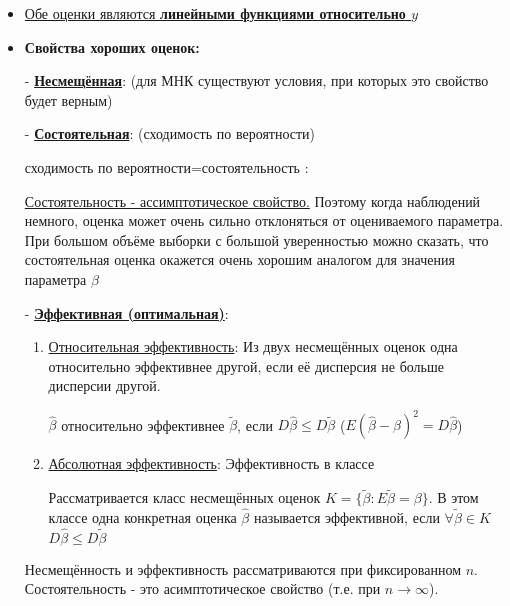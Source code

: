 \documentclass{article}
\begin{document}
\begin{itemize}
\item \underline{Обе оценки являются \textbf{линейными функциями относительно $y$}}

\vspace{2ex}

\item \textbf{Свойства хороших оценок:}
\item[-]\underline{\textbf{Несмещённая}}:  (для МНК существуют условия, при которых это свойство будет верным)
\item[-]\underline{\textbf{Состоятельная}}:  (сходимость по вероятности)

сходимость по вероятности=состоятельность : 

\underline{Состоятельность - ассимптотическое свойство.} Поэтому когда наблюдений немного, оценка может очень сильно отклоняться от оцениваемого параметра. При большом объёме выборки с большой уверенностью можно сказать, что состоятельная оценка окажется очень хорошим аналогом для значения параметра $\beta$

\item[-]\underline{\textbf{Эффективная (оптимальная)}}:
\begin{enumerate}
    \item \underline{Относительная эффективность}:
    Из двух несмещённых оценок одна относительно эффективнее другой, если её дисперсия не больше дисперсии другой.

$\hat{\beta}$ относительно эффективнее $\widetilde{\beta}$, если $D\hat{\beta} \leq D\widetilde{\beta}$ \;\; ($E(\hat{\beta}-\beta)^2=D\hat{\beta}$)
    
    \item \underline{Абсолютная эффективность}: Эффективность в классе

    Рассматривается класс несмещённых оценок
    $K=\{\widetilde{\beta} : E\widetilde{\beta}=\beta \}$. В этом классе одна конкретная оценка $\hat{\beta}$ называется эффективной, если $\forall\widetilde{\beta} \in K \; $ $D\hat{\beta} \leq D\widetilde{\beta}$
\end{enumerate}
\vspace{2ex}
Несмещённость и эффективность рассматриваются при фиксированном $n$. Состоятельность - это асимптотическое свойство (т.е. при $n\rightarrow\infty$).


\end{itemize}
\end{document}

